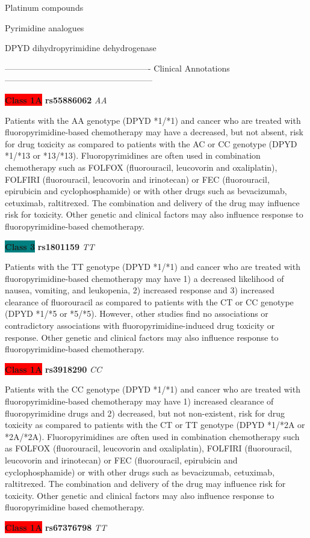 \documentclass{resume} %
\begin{document}
\begin{rSection}{ Platinum compounds }
\end{rSection}\begin{rSection}{ Pyrimidine analogues }
\item[]

\begin{rSubsection}{ DPYD }{ dihydropyrimidine dehydrogenase }{}{}
\item[]

\item[] ---------------------------------------------------- Clinical Annotations -----------------------------------------------------\newline
\item \textbf{\colorbox{red} {Class 1A}} \textbf{ rs55886062 } \textit{ AA }
\item[] Patients with the AA genotype (DPYD *1/*1) and cancer who are treated with fluoropyrimidine-based chemotherapy may have a decreased, but not absent, risk for drug toxicity as compared to patients with the AC or CC genotype (DPYD *1/*13 or *13/*13). Fluoropyrimidines are often used in combination chemotherapy such as FOLFOX (fluorouracil, leucovorin and oxaliplatin), FOLFIRI (fluorouracil, leucovorin and irinotecan) or FEC (fluorouracil, epirubicin and cyclophosphamide) or with other drugs such as bevacizumab, cetuximab, raltitrexed. The combination and delivery of the drug may influence risk for toxicity. Other genetic and clinical factors may also influence response to fluoropyrimidine-based chemotherapy.\item \textbf{\colorbox{teal} {Class 3}} \textbf{ rs1801159 } \textit{ TT }
\item[] Patients with the TT genotype (DPYD *1/*1) and cancer who are treated with fluoropyrimidine-based chemotherapy may have 1) a decreased likelihood of nausea, vomiting, and leukopenia, 2) increased response and 3) increased clearance of fluorouracil as compared to patients with the CT or CC genotype (DPYD *1/*5 or *5/*5). However, other studies find no associations or contradictory associations with fluoropyrimidine-induced drug toxicity or response. Other genetic and clinical factors may also influence response to fluoropyrimidine-based chemotherapy.\item \textbf{\colorbox{red} {Class 1A}} \textbf{ rs3918290 } \textit{ CC }
\item[] Patients with the CC genotype (DPYD *1/*1) and cancer who are treated with fluoropyrimidine-based chemotherapy may have 1) increased clearance of fluoropyrimidine drugs and 2) decreased, but not non-existent, risk for drug toxicity as compared to patients with the CT or TT genotype (DPYD *1/*2A or *2A/*2A). Fluoropyrimidines are often used in combination chemotherapy such as FOLFOX (fluorouracil, leucovorin and oxaliplatin), FOLFIRI (fluorouracil,  leucovorin and irinotecan) or FEC (fluorouracil, epirubicin and cyclophosphamide) or with other drugs such as bevacizumab, cetuximab, raltitrexed. The combination and delivery of the drug may influence risk for toxicity. Other genetic and clinical factors may also influence response to fluoropyrimidine based chemotherapy.\item \textbf{\colorbox{red} {Class 1A}} \textbf{ rs67376798 } \textit{ TT }

\end{rSubsection}
\end{rSection}
\end{document}
